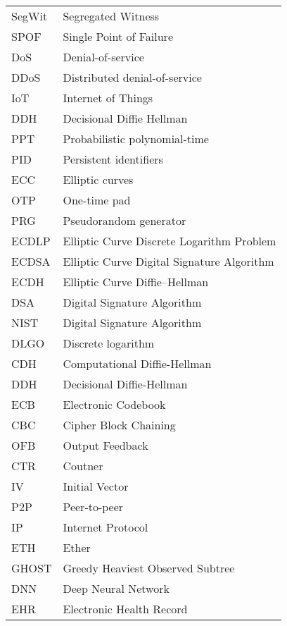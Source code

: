 \begin{center}
\begin{longtable}{ l @{\qquad} l }
	SegWit    & Segregated Witness \\
	SPOF    & Single Point of Failure \\
	DoS    & Denial-of-service \\
	DDoS    & Distributed denial-of-service \\
	IoT    & Internet of Things \\
	DDH    & Decisional Diffie Hellman \\
	PPT    & Probabilistic polynomial-time \\
	PID    & Persistent identifiers \\
	ECC    & Elliptic curves \\
	OTP    & One-time pad\\
	PRG    & Pseudorandom generator\\
	ECDLP    & Elliptic Curve Discrete Logarithm Problem\\
	ECDSA    & Elliptic Curve Digital Signature Algorithm\\
	ECDH    & Elliptic Curve Diffie–Hellman\\
	DSA    & Digital Signature Algorithm\\
	NIST    & Digital Signature Algorithm\\
	DLGO    & Discrete logarithm\\
	CDH    & Computational Diffie-Hellman\\
	DDH    & Decisional Diffie-Hellman\\
	ECB    & Electronic Codebook\\
	CBC    & Cipher Block Chaining\\
	OFB    & Output Feedback\\
	CTR    & Coutner\\
	IV    & Initial Vector\\
	P2P    & Peer-to-peer\\
	IP    & Internet Protocol\\
	ETH    & Ether\\
	GHOST    & Greedy Heaviest Observed Subtree\\
	DNN    & Deep Neural Network\\
	EHR    & Electronic Health Record\\
	\bottomrule
	\end{longtable}
\end{center}
